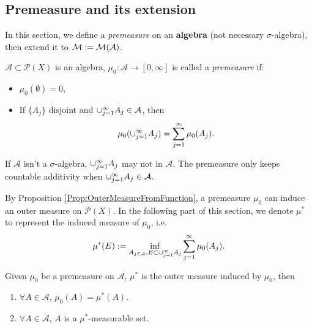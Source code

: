 \subsection{Premeasure and its extension}
In this section, we define a \textit{premeasure} on an \textbf{algebra} 
(not necessary $\sigma$-algebra), 
then extend it to $\mathcal{M}:=\mathcal{M}(\mathcal{A})$.
\begin{defn}[premeasure]
    \label{Defn:Premeasure}
    $\mathcal{A}\subset\mathcal{P}(X)$ is an algebra, 
    $\mu_{0}:\mathcal{A}\rightarrow[0,\infty]$ is called 
    a \textit{premeasure} if:
    \begin{itemize}
        \item $\mu_{0}(\emptyset)=0$,
        \item If $\{A_j\}$ disjoint and 
        $\cup_{j=1}^{\infty}A_j\in\mathcal{A}$, then 
        \begin{displaymath}
            \mu_0(\cup_{j=1}^{\infty}A_j)=\sum_{j=1}^{\infty}\mu_{0}(A_j).
        \end{displaymath}
    \end{itemize}
\end{defn}
\begin{rem}
    If $\mathcal{A}$ isn't a $\sigma$-algebra, 
    $\cup_{j=1}^{\infty}A_{j}$ may not in $\mathcal{A}$. 
    The premeasure only keeps countable additivity 
    when $\cup_{j=1}^{\infty}A_j\in\mathcal{A}$.
\end{rem}
\begin{ntn}
    By Proposition \ref{Prop:OuterMeasureFromFunction}, 
    a premeasure $\mu_{0}$ can induce 
    an outer measure on $\mathcal{P}(X)$. 
    In the following part of this section, 
    we denote $\mu^{*}$ to represent the induced measure 
    of $\mu_{0}$, i.e. 
    \begin{displaymath}
        \mu^{*}(E):=\inf_{A_{j\in\mathcal{A}},E\subset\cup_{j=1}^{\infty}A_j}
        \sum_{j=1}^{\infty}\mu_{0}(A_j).
    \end{displaymath}
\end{ntn}
\begin{prop}
    \label{Prop:PremeasureAndOuterMeas}
    Given $\mu_{0}$ be a premeasure on $\mathcal{A}$, 
    $\mu^{*}$ is the outer measure induced by $\mu_{0}$, then 
    \begin{enumerate}
        \item $\forall A\in\mathcal{A}$, $\mu_{0}(A)=\mu^{*}(A)$.
        \item $\forall A\in\mathcal{A}$, $A$ is a $\mu^{*}$-measurable 
        set.
    \end{enumerate}
\end{prop}
